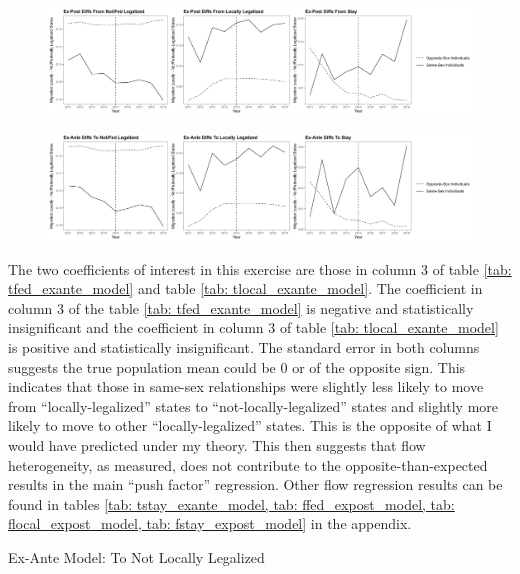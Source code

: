 \documentclass[12pt,letterpaper]{article}
\begin{document}
\begin{figure}[h]
    \centering
    \includegraphics[width=1\linewidth]{outputs/summary_stats/flows_post_diffs.png}
    \caption{}
    \label{fig: flows_post_diffs}
\end{figure}
\begin{figure}[h]
    \centering
    \includegraphics[width=1\linewidth]{outputs/summary_stats/flows_ante_diffs.png}
    \caption{}
    \label{fig: flows_ante_diffs}
\end{figure}

 The two coefficients of interest in this exercise are those in column 3  of table \ref{tab: tfed_exante_model} and table \ref{tab: tlocal_exante_model}. The coefficient in column 3 of the table \ref{tab: tfed_exante_model} is negative and statistically insignificant and the coefficient in column 3 of table \ref{tab: tlocal_exante_model} is positive and statistically insignificant. The standard error in both columns suggests the true population mean could be 0 or of the opposite sign. This indicates that those in same-sex relationships were slightly less likely to move from “locally-legalized” states to “not-locally-legalized” states and slightly more likely to move to other “locally-legalized” states. This is the opposite of what I would have predicted under my theory. This then suggests that flow heterogeneity, as measured, does not contribute to the opposite-than-expected results in the main “push factor” regression. Other flow regression results can be found in tables \ref{tab: tstay_exante_model, tab: ffed_expost_model, tab: flocal_expost_model, tab: fstay_expost_model} in the appendix.

\begin{table}[p] %
    \centering
    \caption{Ex-Ante Model: To Not Locally Legalized}
    \label{tab: tfed_exante_model}
    
\end{table}
\end{document}
